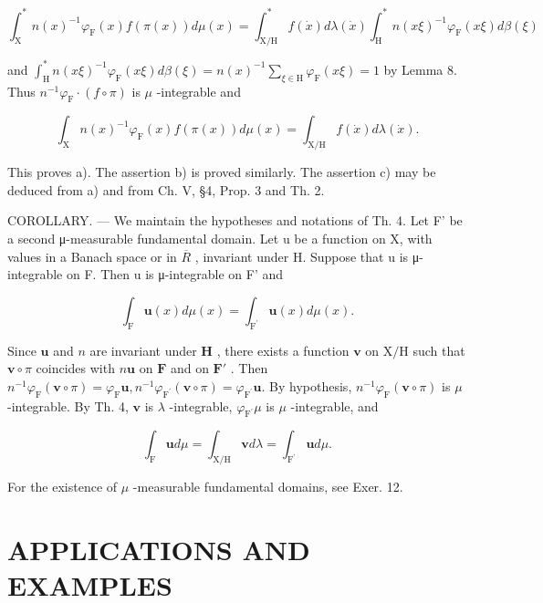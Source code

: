\[
\int_ {\mathrm{X}} ^ {*} n (x) ^ {- 1} \varphi_ {\mathrm{F}} (x) f (\pi (x)) d \mu (x) = \int_ {\mathrm{X/H}} ^ {*} f (\dot {x}) d \lambda (\dot {x}) \int_ {\mathrm{H}} ^ {*} n (x \xi) ^ {- 1} \varphi_ {\mathrm{F}} (x \xi) d \beta (\xi)
\]

and \(\int_{\mathrm{H}}^{*}n(x\xi)^{-1}\varphi_{\mathrm{F}}(x\xi)d\beta (\xi) = n(x)^{-1}\sum_{\xi \in \mathrm{H}}\varphi_{\mathrm{F}}(x\xi) = 1\) by Lemma 8. Thus \(n^{-1}\varphi_{\mathrm{F}}\cdot (f\circ \pi)\) is \(\mu\) -integrable and

\[
\int_ {\mathrm{X}} n (x) ^ {- 1} \varphi_ {\mathrm{F}} (x) f (\pi (x)) d \mu (x) = \int_ {\mathrm{X/H}} f (\dot {x}) d \lambda (\dot {x}).
\]

This proves a). The assertion b) is proved similarly. The assertion c) may be deduced from a) and from Ch. V, §4, Prop. 3 and Th. 2.

COROLLARY. --- We maintain the hypotheses and notations of Th. 4. Let F' be a second μ-measurable fundamental domain. Let u be a function on X, with values in a Banach space or in \(\overline{R}\) , invariant under H. Suppose that u is μ-integrable on F. Then u is μ-integrable on F' and

\[
\int_ {\mathrm{F}} \mathbf {u} (x) d \mu (x) = \int_ {\mathrm{F} ^ {\prime}} \mathbf {u} (x) d \mu (x).
\]

Since \(\mathbf{u}\) and \(n\) are invariant under \(\mathbf{H}\) , there exists a function \(\mathbf{v}\) on \(\mathrm{X / H}\) such that \(\mathbf{v} \circ \pi\) coincides with \(n\mathbf{u}\) on \(\mathbf{F}\) and on \(\mathbf{F}'\) . Then \(n^{-1}\varphi_{\mathrm{F}}(\mathbf{v}\circ \pi) = \varphi_{\mathrm{F}}\mathbf{u}, n^{-1}\varphi_{\mathrm{F}^{\prime}}(\mathbf{v}\circ \pi) = \varphi_{\mathrm{F}^{\prime}}\mathbf{u}.\) By hypothesis, \(n^{-1}\varphi_{\mathrm{F}}(\mathbf{v}\circ \pi)\) is \(\mu\) -integrable. By Th. 4, \(\mathbf{v}\) is \(\lambda\) -integrable, \(\varphi_{\mathrm{F}^{\prime}}\mu\) is \(\mu\) -integrable, and

\[
\int_ {\mathrm{F}} \mathbf {u} d \mu = \int_ {\mathrm{X/H}} \mathbf {v} d \lambda = \int_ {\mathrm{F} ^ {\prime}} \mathbf {u} d \mu .
\]

For the existence of \(\mu\) -measurable fundamental domains, see Exer. 12.

\section{APPLICATIONS AND EXAMPLES}

